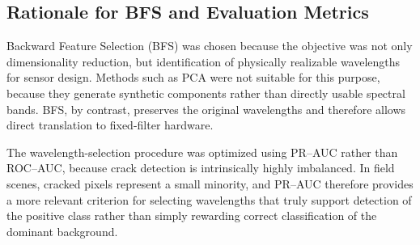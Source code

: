 \subsection{Rationale for BFS and Evaluation Metrics}
\noindent
Backward Feature Selection (BFS) was chosen because the objective was not only dimensionality reduction, but identification of physically realizable wavelengths for sensor design. Methods such as PCA were not suitable for this purpose, because they generate synthetic components rather than directly usable spectral bands. BFS, by contrast, preserves the original wavelengths and therefore allows direct translation to fixed-filter hardware.

\medskip\noindent
The wavelength-selection procedure was optimized using PR--AUC rather than ROC--AUC, because crack detection is intrinsically highly imbalanced. In field scenes, cracked pixels represent a small minority, and PR--AUC therefore provides a more relevant criterion for selecting wavelengths that truly support detection of the positive class rather than simply rewarding correct classification of the dominant background.




